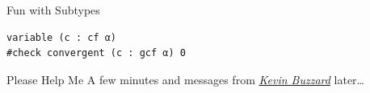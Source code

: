\documentclass{beamer}
\begin{document}
\begin{frame}[fragile]{Fun with Subtypes}
\begin{onlyenv}
\begin{verbatim}
variable (c : cf α)
#check convergent (c : gcf α) 0
\end{verbatim}
\end{onlyenv}
\end{frame}
\begin{frame}{Please Help Me}
    \center A few minutes and messages from \href{http://wwwf.imperial.ac.uk/~buzzard/}{\emph{Kevin Buzzard}} later\dots
\end{frame}
\end{document}

